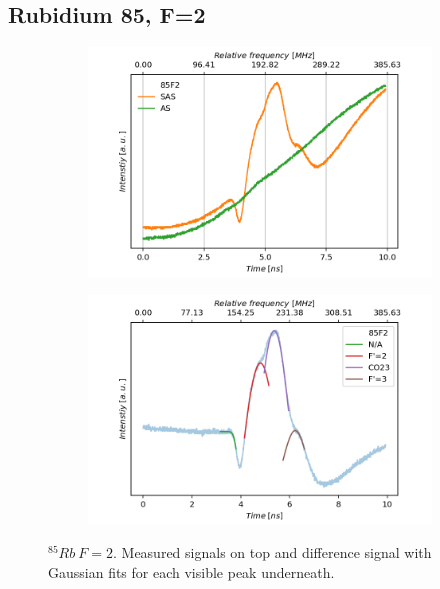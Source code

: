 \documentclass[]{article}
\begin{document}
\subsection{Rubidium 85, F=2}
\begin{figure}[H]
\centering
\begin{subfigure}{.7\textwidth}
\includegraphics[width=\linewidth]{Plots/85F2_Both.png}
\end{subfigure}

\begin{subfigure}[c]{.7\textwidth}
\includegraphics[width=\linewidth]{Plots/85F2_Diff.png}
\end{subfigure}
\caption{$^{85}Rb\ F=2 $. Measured signals on top and difference signal with Gaussian fits for each visible peak underneath.}
\label{fig: 85F2}
\end{figure}
\end{document}
